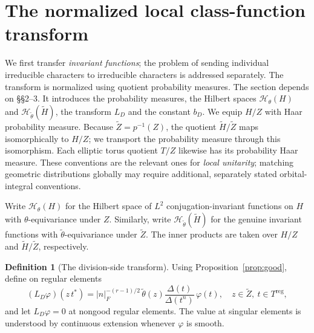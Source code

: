 \documentclass[11pt]{article}
\newcommand{\tH}{\widetilde H}
\newcommand{\tZ}{\widetilde Z}
\newcommand{\reg}{\mathrm{reg}}
\theoremstyle{plain}
\theoremstyle{definition}
\newtheorem{definition}[theorem]{Definition}
\begin{document}
\section{The normalized local class-function transform}\label{sec:local}
We first transfer \emph{invariant functions}; the problem of sending
individual irreducible characters to irreducible characters is
addressed separately. The transform is normalized using quotient
probability measures. The section depends on \S\S2--3. It introduces the probability measures, the Hilbert spaces $\mathcal H_\theta(H)$ and $\mathcal H_{\widetilde\theta}(\tH)$, the transform $L_D$ and the constant $b_D$.
We equip $H/Z$ with Haar probability measure. Because $\tZ=p^{-1}(Z)$, the quotient $\tH/\tZ$ maps isomorphically to $H/Z$; we transport the probability measure through this isomorphism. Each elliptic torus quotient $T/Z$ likewise has its probability Haar measure. These conventions are the relevant ones for \emph{local unitarity}; matching geometric distributions globally may require additional, separately stated orbital-integral conventions.

Write $\mathcal H_\theta(H)$ for the Hilbert space of $L^2$ conjugation-invariant functions on $H$ with $\theta$-equivariance under $Z$. Similarly, write $\mathcal H_{\widetilde\theta}(\tH)$ for the genuine invariant functions with $\widetilde\theta$-equivariance under $\tZ$. The inner products are taken over $H/Z$ and $\tH/\tZ$, respectively.

\begin{definition}[The division-side transform]\label{def:L}
Using Proposition~\ref{prop:good}, define on regular elements
\begin{equation}\label{eq:transfer}
\boxed{\quad
(L_D\varphi)(z\,t^*)=
|n|_F^{-(r-1)/2}\,\widetilde\theta(z)
\frac{\Delta(t)}{\Delta(t^n)}\,\varphi(t),
\quad z\in\tZ,
\ t\in T^{\reg},\quad}
\end{equation}
and let $L_D\varphi=0$ at nongood regular elements. The value at singular elements is understood by continuous extension whenever $\varphi$ is smooth.
\end{definition}
\end{document}
